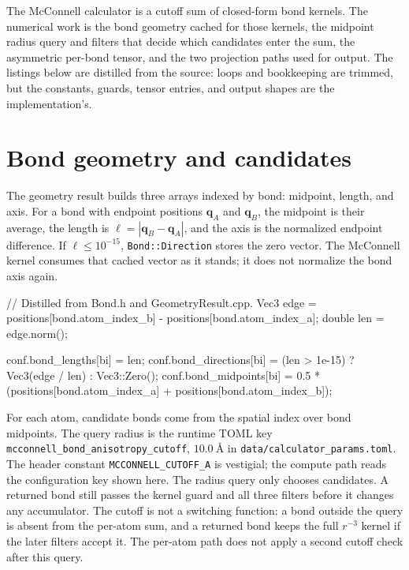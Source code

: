 \documentclass[11pt]{article}
\newcommand{\code}[1]{\texttt{#1}}
\begin{document}

The McConnell calculator is a cutoff sum of closed-form bond kernels. The
numerical work is the bond geometry cached for those kernels, the midpoint
radius query and filters that decide which candidates enter the sum, the
asymmetric per-bond tensor, and the two projection paths used for output. The
listings below are distilled from the source: loops and bookkeeping are
trimmed, but the constants, guards, tensor entries, and output shapes are the
implementation's.

\section{Bond geometry and candidates}

The geometry result builds three arrays indexed by bond: midpoint, length, and
axis. For a bond with endpoint positions \(\bm q_A\) and \(\bm q_B\), the
midpoint is their average, the length is
\(\ell = |\bm q_B-\bm q_A|\), and the axis is the normalized endpoint
difference. If \(\ell\le 10^{-15}\), \code{Bond::Direction} stores the zero
vector. The McConnell kernel consumes that cached vector as it stands; it does
not normalize the bond axis again.

\begin{codebox}
// Distilled from Bond.h and GeometryResult.cpp.
Vec3 edge = positions[bond.atom_index_b] - positions[bond.atom_index_a];
double len = edge.norm();

conf.bond_lengths[bi]    = len;
conf.bond_directions[bi] = (len > 1e-15) ? Vec3(edge / len) : Vec3::Zero();
conf.bond_midpoints[bi]  =
    0.5 * (positions[bond.atom_index_a] + positions[bond.atom_index_b]);
\end{codebox}

For each atom, candidate bonds come from the spatial index over bond
midpoints. The query radius is the runtime TOML key
\code{mcconnell\_bond\_anisotropy\_cutoff}, \(\SI{10.0}{\angstrom}\) in
\code{data/calculator\_params.toml}. The header constant
\code{MCCONNELL\_CUTOFF\_A} is vestigial; the compute path reads the
configuration key shown here. The radius query only chooses candidates. A
returned bond still passes the kernel guard and all three filters before it
changes any accumulator. The cutoff is not a switching function: a bond outside
the query is absent from the per-atom sum, and a returned bond keeps the full
\(r^{-3}\) kernel if the later filters accept it. The per-atom path does not
apply a second cutoff check after this query.
\end{document}

